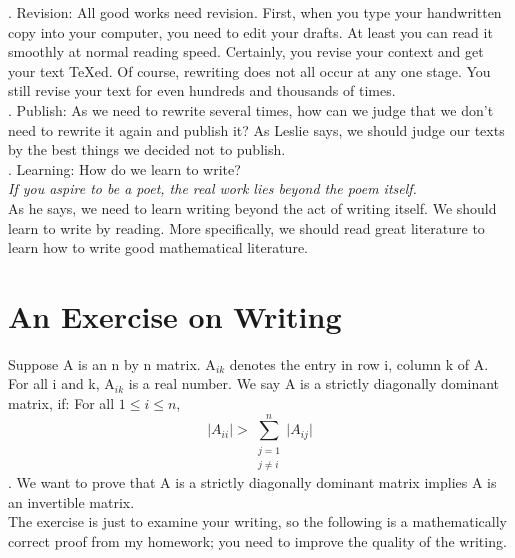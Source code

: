 \documentclass[12pt,a4paper]{article}  %
\theoremstyle{definition}
\numberwithin{equation}{section}
\begin{document}
. Revision: All good works need revision. First, when you type your handwritten copy into your computer, you need to edit your drafts. At least you can read it smoothly at normal reading speed. Certainly, you revise your context and get your text \TeX ed. Of course, rewriting does not all occur at any one stage. You still revise your text for even hundreds and thousands of times.\\

. Publish: As we need to rewrite several times, how can we judge that we don't need to rewrite it again and publish it? As Leslie says, we should judge our texts by the best things we decided not to publish.\\

. Learning: How do we learn to write?\\
\textit{If you aspire to be a poet, the real work lies beyond the poem itself.}\\
As he says, we need to learn writing beyond the act of writing itself. We should learn to write by reading. More specifically, we should read great literature to learn how to write good mathematical literature. \\

\section{An Exercise on Writing}
\indent Suppose A is an n by n matrix. A$_{ik}$ denotes the entry in row i, column k of A.\\ 
For all i and k, A$_{ik}$ is a real number. We say A is a strictly diagonally dominant matrix, if: {\large For all \(1\leq i\leq n\),
	\[
	\vert A_{ii}\vert>\sum_{\substack {j=1 \\ j\neq i}}^{n}\vert A_{ij}\vert
	\].}
\indent We want to prove that A is a strictly diagonally dominant matrix implies A is an invertible matrix.\\
The exercise is just to examine your writing, so the following is a mathematically correct proof from my homework; you need to improve the quality of the writing.\\
\end{document}
